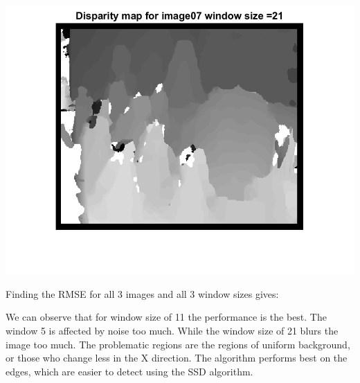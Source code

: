 \documentclass[a4paper]{iacas}
\begin{document}
\begin{minipage}{\linewidth}
	\includegraphics[scale=1]{results/04_16_06/disp_map_07_template_3.png}
	\label{fig_4}
\end{minipage}
\vskip 0.1in




Finding the RMSE for all 3 images and all 3 window sizes gives:



We can observe that for window size of 11 the performance is the best. The window 5 is affected by noise too much. While the window size of 21 blurs the image too much. The problematic regions are the regions of uniform background, or those who change less in the X direction. The algorithm performs best on the edges, which are easier to detect using the SSD algorithm.
\end{document}
